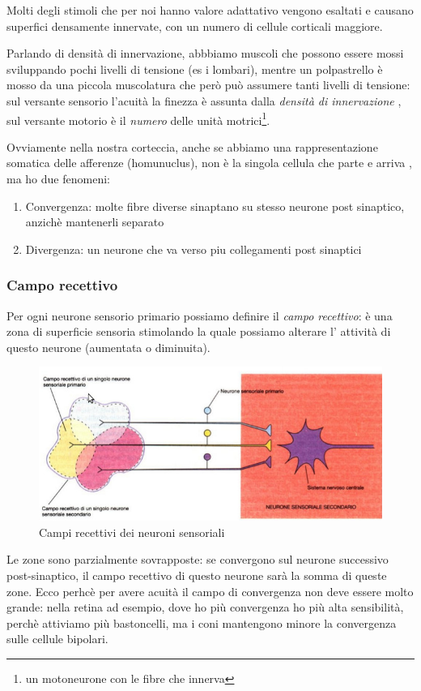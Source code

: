 \documentclass[a4paper,12pt]{article}
\begin{document}
Molti degli stimoli che per noi hanno valore adattativo vengono esaltati e causano superfici densamente innervate, con un numero di cellule corticali maggiore.

Parlando di densità di innervazione, abbbiamo muscoli che possono essere mossi sviluppando pochi livelli di tensione (es i lombari), mentre un polpastrello è mosso da una piccola muscolatura che però può assumere tanti livelli di tensione: sul versante sensorio l'acuità la finezza è assunta dalla \emph{densità di innervazione} , sul versante motorio è il \emph{numero} delle unità motrici\footnote{un motoneurone con le fibre che innerva}. 

Ovviamente nella nostra corteccia, anche se abbiamo una rappresentazione somatica delle afferenze (homunuclus), non è la singola cellula che parte e arriva , ma ho due fenomeni:
\begin{enumerate}
    \item{Convergenza: molte fibre diverse sinaptano su stesso neurone post sinaptico, anzichè mantenerli separato}
    \item{Divergenza: un neurone che va verso piu collegamenti post sinaptici}
    \end{enumerate}

\subsubsection{Campo recettivo}
Per ogni neurone sensorio primario possiamo definire il \emph{campo recettivo}: è una zona di superficie sensoria stimolando la quale possiamo alterare l' attività di questo neurone (aumentata o diminuita).


\begin{figure}[H]
\centering
\includegraphics[scale=0.4]{immagine/campo.jpg}
\caption{Campi recettivi dei neuroni sensoriali}
\end{figure}


Le zone sono parzialmente sovrapposte: se convergono sul neurone successivo post-sinaptico, il campo recettivo di questo neurone sarà la somma di queste zone. Ecco perhcè per avere acuità il campo di convergenza non deve essere molto grande: nella retina ad esempio, dove ho più convergenza ho più alta sensibilità, perchè attiviamo più bastoncelli, ma i coni mantengono minore la convergenza sulle cellule bipolari.
\end{document}

